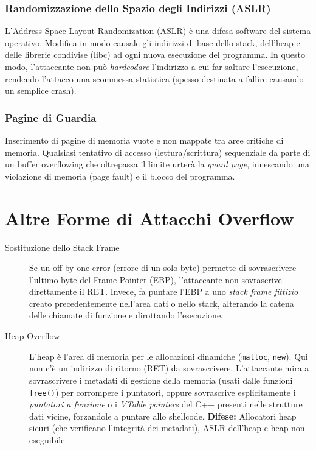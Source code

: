 \subsubsection{Randomizzazione dello Spazio degli Indirizzi (ASLR)}
L'Address Space Layout Randomization (ASLR) è una difesa software del sistema operativo. Modifica in modo causale gli indirizzi di base dello stack, dell'heap e delle librerie condivise (libc) ad ogni nuova esecuzione del programma. In questo modo, l'attaccante non può \textit{hardcodare} l'indirizzo a cui far saltare l'esecuzione, rendendo l'attacco una scommessa statistica (spesso destinata a fallire causando un semplice crash).

\subsubsection{Pagine di Guardia}
Inserimento di pagine di memoria vuote e non mappate tra aree critiche di memoria. Qualsiasi tentativo di accesso (lettura/scrittura) sequenziale da parte di un buffer overflowing che oltrepassa il limite urterà la \textit{guard page}, innescando una violazione di memoria (page fault) e il blocco del programma.

\section{Altre Forme di Attacchi Overflow}

\begin{description}
    \item[Sostituzione dello Stack Frame] Se un off-by-one error (errore di un solo byte) permette di sovrascrivere l'ultimo byte del Frame Pointer (EBP), l'attaccante non sovrascrive direttamente il RET. Invece, fa puntare l'EBP a uno \textit{stack frame fittizio} creato precedentemente nell'area dati o nello stack, alterando la catena delle chiamate di funzione e dirottando l'esecuzione.
    \item[Heap Overflow] L'heap è l'area di memoria per le allocazioni dinamiche (\texttt{malloc}, \texttt{new}). Qui non c'è un indirizzo di ritorno (RET) da sovrascrivere.
L'attaccante mira a sovrascrivere i metadati di gestione della memoria (usati dalle funzioni \texttt{free()}) per corrompere i puntatori, oppure sovrascrive esplicitamente i \textit{puntatori a funzione} o i \textit{VTable pointers} del C++ presenti nelle strutture dati vicine, forzandole a puntare allo shellcode.
\textbf{Difese:} Allocatori heap sicuri (che verificano l'integrità dei metadati), ASLR dell'heap e heap non eseguibile.
\end{description}